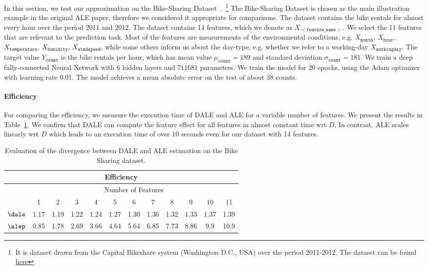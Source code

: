 In this section, we test our approximation on the Bike-Sharing
Dataset~\cite{BikeSharing}.~\footnote{It is dataset drawn from the
  Capital Bikeshare system (Washington D.C., USA) over the period
  2011-2012. The dataset can be found
  \href{https://archive.ics.uci.edu/ml/machine-learning-databases/00275/Bike-Sharing-Dataset.zip}{here}}
The Bike-Sharing Dataset is chosen as the main illustration example in
the original ALE paper, therefore we considered it appropriate for
comparisons. The dataset contains the bike rentals for almost every
hour over the period 2011 and 2012. The dataset contains 14 features,
which we denote as \( X_{\mathtt{<feature\_name>}} \). We select the
11 features that are relevant to the prediction task. Most of the
features are measurements of the environmental conditions, e.g.
\(X_{\mathtt{month}}\), \(X_{\mathtt{hour}}\),
\(X_{\mathtt{temperature}}\), \(X_{\mathtt{humidity}}\),
\(X_{\mathtt{windspeed}}\), while some others inform us about the
day-type, e.g. whether we refer to a working-day
\(X_{\mathtt{workingday}}\). The target value \( Y_{\mathtt{count}}\)
is the bike rentals per hour, which has mean value
\(\mu_{\mathtt{count}} = 189\) and standard deviation
\(\sigma_{\mathtt{count}} = 181\). We train a deep fully-connected
Neural Network with 6 hidden layers and \(711681\) parameters. We
train the model for \(20\) epochs, using the Adam optimizer with
learning rate 0.01. The model achieves a mean absolute error on the
test of about \(38\) counts.

\paragraph{Efficiency} For comparing the efficiency, we measure the
execution time of DALE and ALE for a variable number of features. We
present the results in Table~\ref{tab:bike-sharing-efficiency}. We
confirm that DALE can compute the feature effect for all features in
almost constant time wrt \(D\). In contrast, ALE scales linearly wrt
\(D\) which leads to an execution time of over \(10\) seconds even for
our dataset with 14 features.

\begin{table}
  \centering
  \begin{tabular}{c|c|c|c|c|c|c|c|c|c|c|c}
    \multicolumn{12}{c}{Efficiency} \\
    \hline\hline
    & \multicolumn{11}{|c}{Number of Features} \\
    \hline
    & 1 & 2 & 3 & 4 & 5 & 6 & 7 & 8 & 9 & 10 & 11 \\
    \hline
    \( \dale \) & 1.17 & 1.19 & 1.22 & 1.24 & 1.27 & 1.30 & 1.36 & 1.32 & 1.33 & 1.37 & 1.39 \\
    \hline
    \( \alep \) & 0.85 & 1.78 & 2.69 & 3.66 & 4.64 & 5.64 & 6.85 & 7.73 & 8.86 & 9.9 & 10.9 \\
    \hline
  \end{tabular}
  \caption{Evaluation of the divergence between DALE and ALE
    estimation on the Bike Sharing dataset.}
  \label{tab:bike-sharing-efficiency}
\end{table}

